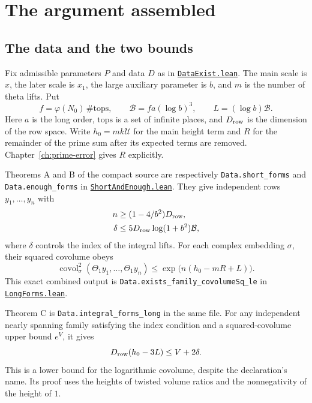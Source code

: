 \documentclass[11pt,oneside,openany]{amsbook}
\theoremstyle{remark}
\numberwithin{equation}{section}
\newcommand{\covol}{\operatorname{covol}}
\newcommand{\ghroot}{https://github.com/lsernau/grh-lean/blob/}
\newcommand{\ghrev}{72fead102f663d5c7a407964a13dc0cf9d977207}
\newcommand{\leanfile}[2]{%
  \href{\ghroot\ghrev/grh-compact/src/#1}{\nolinkurl{#2}}}
\begin{document}
\chapter{The argument assembled}
\label{ch:assembly}
\section{The data and the two bounds}
Fix admissible parameters $P$ and data $D$ as in
\leanfile{New/Data/DataExist.lean}{DataExist.lean}. The main scale is
$x$, the later scale is $x_1$, the large auxiliary parameter is $b$,
and $m$ is the number of theta lifts. Put
\begin{equation}
\label{eq:budget}
f=\varphi(N_0)\,\#\mathrm{tops},\qquad
\mathcal B=f a(\log b)^3,\qquad
L=(\log b)\mathcal B.
\end{equation}
Here $a$ is the long order, $\mathrm{tops}$ is a set of infinite
places, and $D_{\rm row}$ is the dimension of the row space.
Write $h_0=m k\mathcal U$ for the main height term and
$R$ for the remainder of the prime sum after its expected terms
are removed. Chapter~\ref{ch:prime-error} gives $R$ explicitly.

Theorems A and B of the compact source are respectively
\texttt{Data.short\_forms} and \texttt{Data.enough\_forms} in
\leanfile{New/Endgame/ShortAndEnough.lean}{ShortAndEnough.lean}.
They give independent rows $y_1,\ldots,y_n$ with
\begin{align}
\label{eq:nearly-all}
n&\ge(1-4/b^2)D_{\rm row},\\
\label{eq:index}
\delta&\le5D_{\rm row}\log(1+b^2)\mathcal B,
\end{align}
where $\delta$ controls the index of the integral lifts.
For each complex embedding $\sigma$, their squared covolume obeys
\begin{equation}
\label{eq:upper-covolume}
\covol_\sigma^2(\Theta_1 y_1,\ldots,\Theta_1 y_n)
\le\exp\bigl(n(h_0-mR+L)\bigr).
\end{equation}
This exact combined output is
\texttt{Data.exists\_family\_covolumeSq\_le} in
\leanfile{New/Endgame/LongForms.lean}{LongForms.lean}.

Theorem C is \texttt{Data.integral\_forms\_long} in the same file.
For any independent nearly spanning family satisfying the index
condition and a squared-covolume upper bound $e^V$, it gives
\begin{equation}
\label{eq:lower-covolume}
D_{\rm row}(h_0-3L)\le V+2\delta.
\end{equation}
This is a lower bound for the logarithmic covolume, despite the
declaration's name. Its proof uses the heights of twisted volume
ratios and the nonnegativity of the height of $1$.
\end{document}

